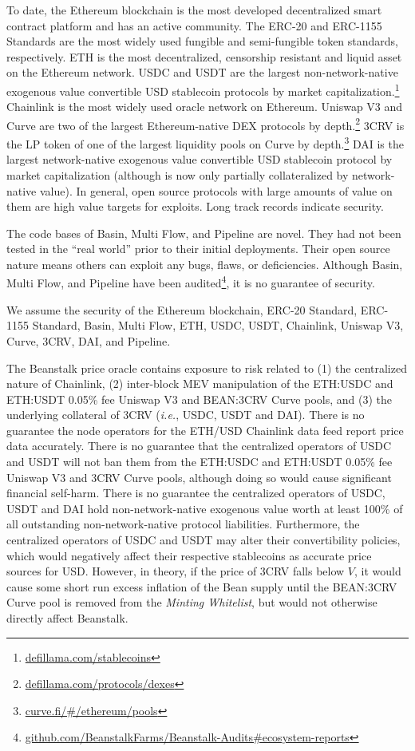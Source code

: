 \documentclass[tikz]{article}
\newcommand{\term}[1]{\textsl{#1}}
\newcommand{\fref}[1]{\footnote{\href{http://#1}{#1}}}
\begin{document}
To date, the Ethereum blockchain is the most developed decentralized smart contract platform and has an active community. The ERC-20 and ERC-1155 Standards are the most widely used fungible and semi-fungible token standards, respectively. ETH is the most decentralized, censorship resistant and liquid asset on the Ethereum network. USDC and USDT are the largest non-network-native exogenous value convertible USD stablecoin protocols by market capitalization.\fref{defillama.com/stablecoins} Chainlink is the most widely used oracle network on Ethereum. Uniswap V3 and Curve are two of the largest Ethereum-native DEX protocols by depth.\fref{defillama.com/protocols/dexes} 3CRV is the LP token of one of the largest liquidity pools on Curve by depth.\fref{curve.fi/\#/ethereum/pools} DAI is the largest network-native exogenous value convertible USD stablecoin protocol by market capitalization (although is now only partially collateralized by network-native value). In general, open source protocols with large amounts of value on them are high value targets for exploits. Long track records indicate security. 

The code bases of Basin, Multi Flow, and Pipeline are novel. They had not been tested in the “real world” prior to their initial deployments. Their open source nature means others can exploit any bugs, flaws, or deficiencies. Although Basin, Multi Flow, and Pipeline have been audited\fref{github.com/BeanstalkFarms/Beanstalk-Audits\#ecosystem-reports}, it is no guarantee of security.

We assume the security of the Ethereum blockchain, ERC-20 Standard, ERC-1155 Standard, Basin, Multi Flow, ETH, USDC, USDT, Chainlink, Uniswap V3, Curve, 3CRV, DAI, and Pipeline.

The Beanstalk price oracle contains exposure to risk related to (1) the centralized nature of Chainlink, (2) inter-block MEV manipulation of the ETH:USDC and ETH:USDT 0.05\% fee Uniswap V3 and BEAN:3CRV Curve pools, and (3) the underlying collateral of 3CRV (\term{i.e.}, USDC, USDT and DAI). There is no guarantee the node operators for the ETH/USD Chainlink data feed report price data accurately. There is no guarantee that the centralized operators of USDC and USDT will not ban them from the ETH:USDC and ETH:USDT 0.05\% fee Uniswap V3 and 3CRV Curve pools, although doing so would cause significant financial self-harm. There is no guarantee the centralized operators of USDC, USDT and DAI hold non-network-native exogenous value worth at least 100\% of all outstanding non-network-native protocol liabilities. Furthermore, the centralized operators of USDC and USDT may alter their convertibility policies, which would negatively affect their respective stablecoins as accurate price sources for USD. However, in theory, if the price of 3CRV falls below \hyperlink{ht216}{$V$}, it would cause some short run excess inflation of the Bean supply until the BEAN:3CRV Curve pool is removed from the \term{Minting Whitelist}, but would not otherwise directly affect Beanstalk.
\end{document}
